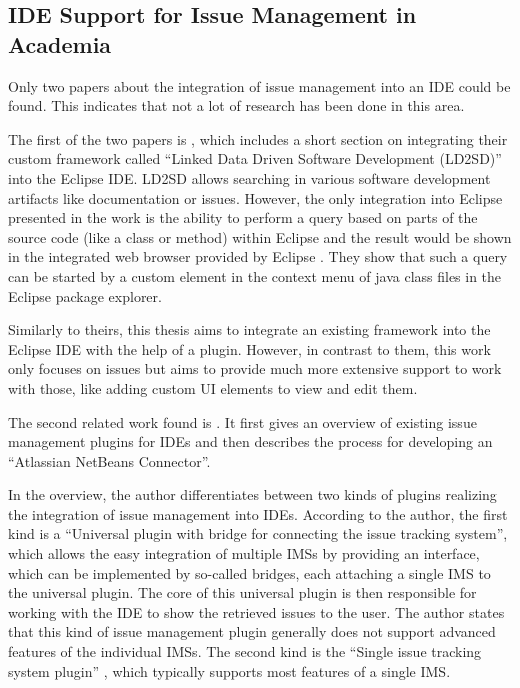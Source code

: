 \subsection{\gls{IDE} Support for Issue Management in Academia} 
\label{ssec:ch2:ss2.2}
Only two papers about the integration of issue management into an \gls{IDE} could be found.
This indicates that not a lot of research has been done in this area.

The first of the two papers is \cite{iqbal2009integrating},
which includes a short section on integrating their custom framework called ``Linked Data Driven Software Development (LD2SD)'' 
into the \gls{Eclipse} \gls{IDE}.
LD2SD allows searching in various software development artifacts like documentation or issues.
However, the only integration into \gls{Eclipse} presented in the work is the ability to perform a query based on
parts of the source code (like a class or method) within \gls{Eclipse} and the result would be shown in the integrated web browser provided by \gls{Eclipse} \cite{iqbal2009integrating}.
They show that such a query can be started by a custom element in the context menu of \gls{java} class files in the \gls{Eclipse} package explorer.

Similarly to theirs, this thesis aims to integrate an existing framework into the \gls{Eclipse} \gls{IDE} with the help of a plugin.
However, in contrast to them, this work only focuses on issues but aims to provide much more extensive support to work with those, like adding custom \gls{UI} elements to view and edit them.

The second related work found is \cite{janak2009issue}.
It first gives an overview of existing issue management plugins for \glspl{IDE} and then describes the process for developing an ``Atlassian NetBeans Connector''.

In the overview, the author differentiates between two kinds of plugins realizing the integration of issue management into \glspl{IDE}.
According to the author, the first kind is a ``Universal plugin with bridge for connecting the issue tracking system'',
which allows the easy integration of multiple \glspl{IMS} by providing an interface, which can be implemented by so-called bridges, 
each attaching a single \gls{IMS} to the universal plugin.
The core of this universal plugin is then responsible for working with the \gls{IDE} to show the retrieved issues to the user.
The author states that this kind of issue management plugin generally does not support advanced features of the individual \glspl{IMS}.
The second kind is the ``Single issue tracking system plugin'' \cite{janak2009issue}, which typically supports most features of a single \gls{IMS}.

